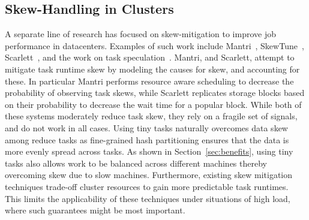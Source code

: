 \subsection{Skew-Handling in Clusters}
A separate line of research has focused on skew-mitigation to improve job
performance in datacenters. Examples of such work include
Mantri~\cite{ananthanarayanan2010reining}, SkewTune~\cite{kwon2012skewtune},
Scarlett~\cite{ananthanarayanan2011scarlett}, and the work on task
speculation~\cite{zaharia2008improving}. Mantri, and Scarlett, attempt to
mitigate task runtime skew by modeling the causes for skew, and accounting for
these. In particular Mantri performs resource aware scheduling to decrease the
probability of observing task skews, while Scarlett replicates storage blocks
based on their probability to decrease the wait time for a popular block. While
both of these systems moderately reduce task skew, they rely on a fragile set of
signals, and do not work in all cases. Using tiny tasks naturally overcomes data
skew among reduce tasks as fine-grained hash partitioning ensures that the data is
more evenly spread across tasks. As shown in 
Section~\ref{sec:benefits}, using tiny tasks also allows work to be balanced across
different machines thereby overcoming skew due to slow machines.
Furthermore, existing skew mitigation techniques trade-off cluster resources to
gain more predictable task runtimes. This limits the applicability of these
techniques under situations of high load, where such guarantees might be most
important.

